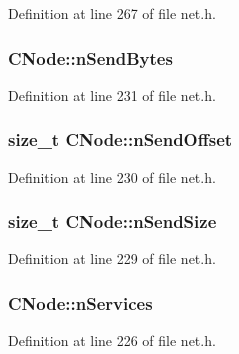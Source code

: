 Definition at line 267 of file net.\+h.

\hypertarget{class_c_node_a33e24a9544df3c60f9e1ec05b5e91051}{}
\subsubsection[{n\+Send\+Bytes}]{ C\+Node\+::n\+Send\+Bytes}\label{class_c_node_a33e24a9544df3c60f9e1ec05b5e91051}


Definition at line 231 of file net.\+h.

\hypertarget{class_c_node_a090bda86de6b84c3db83e1f029d4f453}{}
\subsubsection[{n\+Send\+Offset}]{\setlength{\rightskip}{0pt plus 5cm}size\+\_\+t C\+Node\+::n\+Send\+Offset}\label{class_c_node_a090bda86de6b84c3db83e1f029d4f453}


Definition at line 230 of file net.\+h.

\hypertarget{class_c_node_a3c99b7e2b0e53feb58f6859453456f74}{}
\subsubsection[{n\+Send\+Size}]{\setlength{\rightskip}{0pt plus 5cm}size\+\_\+t C\+Node\+::n\+Send\+Size}\label{class_c_node_a3c99b7e2b0e53feb58f6859453456f74}


Definition at line 229 of file net.\+h.

\hypertarget{class_c_node_a8259db81211f6837585c6f82f89414ff}{}
\subsubsection[{n\+Services}]{ C\+Node\+::n\+Services}\label{class_c_node_a8259db81211f6837585c6f82f89414ff}


Definition at line 226 of file net.\+h.

\hypertarget{class_c_node_a597b41bd64e2ac9391b7211e65aeb52a}{}
